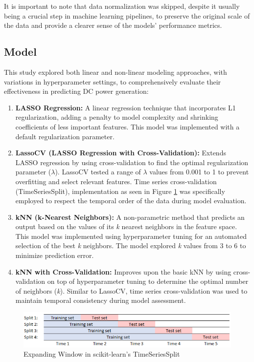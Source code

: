 It is important to note that data normalization was skipped, despite it usually being a crucial step in machine learning pipelines, to preserve the original scale of the data and provide a clearer sense of the models' performance metrics.

\subsection{Model}

This study explored both linear and non-linear modeling approaches, with variations in hyperparameter settings, to comprehensively evaluate their effectiveness in predicting DC power generation:

\begin{enumerate}
   \item \textbf{LASSO Regression:} A linear regression technique that incorporates L1 regularization, adding a penalty to model complexity and shrinking coefficients of less important features. This model was implemented with a default regularization parameter.
   \item \textbf{LassoCV (LASSO Regression with Cross-Validation):} Extends LASSO regression by using cross-validation to find the optimal regularization parameter (\(\lambda\)).  LassoCV tested a range of  \(\lambda\) values from 0.001 to 1 to prevent overfitting and select relevant features. Time series cross-validation (TimeSeriesSplit), implementation as seen in Figure \ref{fig:time_series_split} was specifically employed to respect the temporal order of the data during model evaluation.
   \item \textbf{kNN (k-Nearest Neighbors):} A non-parametric method that predicts an output based on the values of its \emph{k} nearest neighbors in the feature space. This model was implemented using hyperparameter tuning for an automated selection of the best \emph{k} neighbors. The model explored \emph{k} values from 3 to 6 to minimize prediction error. 
   \item \textbf{kNN with Cross-Validation:} Improves upon the basic kNN by using cross-validation on top of hyperparameter tuning to determine the optimal number of neighbors (\emph{k}). Similar to LassoCV, time series cross-validation was used to maintain temporal consistency during model assessment. 
\end{enumerate} 

\begin{figure}[!htpb]
    \centering
    \includegraphics[width=\linewidth]{Figures/time_series_split.png}
    \caption{Expanding Window in scikit-learn's TimeSeriesSplit}
    \label{fig:time_series_split}
\end{figure}

